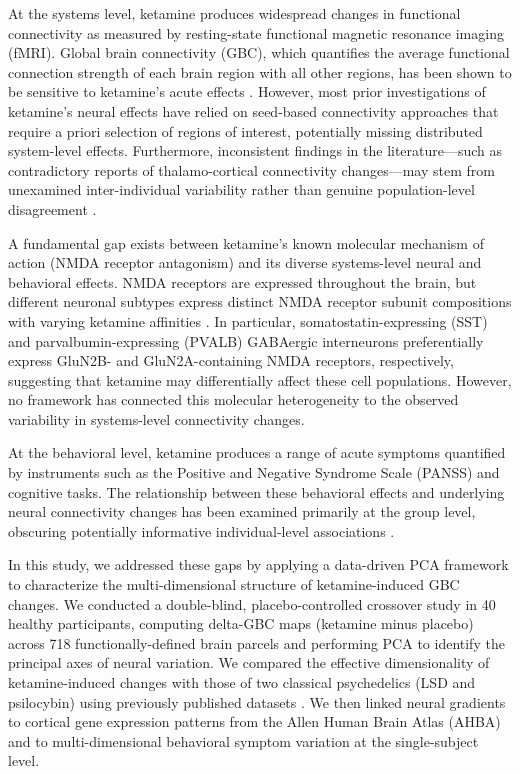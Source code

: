\documentclass[12pt]{article}
\begin{document}
At the systems level, ketamine produces widespread changes in functional connectivity as measured by resting-state functional magnetic resonance imaging (fMRI). Global brain connectivity (GBC), which quantifies the average functional connection strength of each brain region with all other regions, has been shown to be sensitive to ketamine's acute effects \citep{cole2012global, anticevic2015nmda}. However, most prior investigations of ketamine's neural effects have relied on seed-based connectivity approaches that require a priori selection of regions of interest, potentially missing distributed system-level effects. Furthermore, inconsistent findings in the literature---such as contradictory reports of thalamo-cortical connectivity changes---may stem from unexamined inter-individual variability rather than genuine population-level disagreement \citep{driesen2013relationship}.

A fundamental gap exists between ketamine's known molecular mechanism of action (NMDA receptor antagonism) and its diverse systems-level neural and behavioral effects. NMDA receptors are expressed throughout the brain, but different neuronal subtypes express distinct NMDA receptor subunit compositions with varying ketamine affinities \citep{tremblay2016gabaergic}. In particular, somatostatin-expressing (SST) and parvalbumin-expressing (PVALB) GABAergic interneurons preferentially express GluN2B- and GluN2A-containing NMDA receptors, respectively, suggesting that ketamine may differentially affect these cell populations. However, no framework has connected this molecular heterogeneity to the observed variability in systems-level connectivity changes.

At the behavioral level, ketamine produces a range of acute symptoms quantified by instruments such as the Positive and Negative Syndrome Scale (PANSS) \citep{kay1987positive} and cognitive tasks. The relationship between these behavioral effects and underlying neural connectivity changes has been examined primarily at the group level, obscuring potentially informative individual-level associations \citep{krystal1994subanesthetic}.

In this study, we addressed these gaps by applying a data-driven PCA framework to characterize the multi-dimensional structure of ketamine-induced GBC changes. We conducted a double-blind, placebo-controlled crossover study in 40 healthy participants, computing delta-GBC maps (ketamine minus placebo) across 718 functionally-defined brain parcels and performing PCA to identify the principal axes of neural variation. We compared the effective dimensionality of ketamine-induced changes with those of two classical psychedelics (LSD and psilocybin) using previously published datasets \citep{preller2019changes, carhart2016neural}. We then linked neural gradients to cortical gene expression patterns from the Allen Human Brain Atlas (AHBA) \citep{hawrylycz2012anatomically} and to multi-dimensional behavioral symptom variation at the single-subject level.
\end{document}
